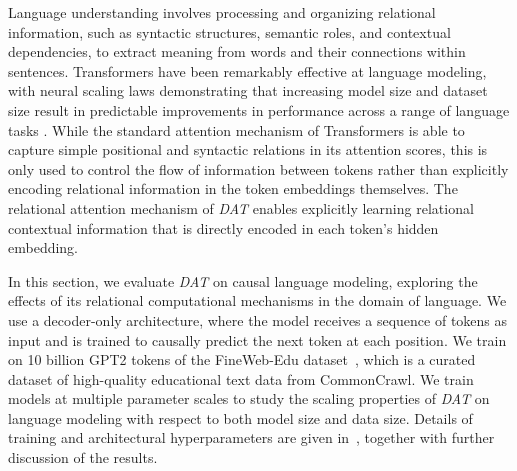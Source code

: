 Language understanding involves processing and organizing relational information, such as syntactic structures, semantic roles, and contextual dependencies, to extract meaning from words and their connections within sentences. Transformers have been remarkably effective at language modeling, with neural scaling laws demonstrating that increasing model size and dataset size result in predictable improvements in performance across a range of language tasks \citep{kaplan2020scalinglawsneurallanguage}. While the standard attention mechanism of Transformers is able to capture simple positional and syntactic relations in its attention scores, this is only used to control the flow of information between tokens rather than explicitly encoding relational information in the token embeddings themselves. The relational attention mechanism of \textit{DAT} enables explicitly learning relational contextual information that is directly encoded in each token's hidden embedding.

In this section, we evaluate \textit{DAT} on causal language modeling, exploring the effects of its relational computational mechanisms in the domain of language. We use a decoder-only architecture, where the model receives a sequence of tokens as input and is trained to causally predict the next token at each position. We train on 10 billion GPT2 tokens of the FineWeb-Edu dataset~\citep{lozhkov2024fineweb-edu}, which is a curated dataset of high-quality educational text data from CommonCrawl. We train models at multiple parameter scales to study the scaling properties of \textit{DAT} on language modeling with respect to both model size and data size. Details of training and architectural hyperparameters are given in~, together with further discussion of the results.

%     

%     

